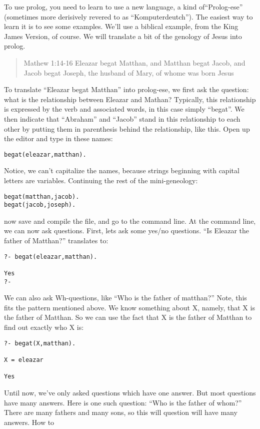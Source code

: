 \documentclass{book}[9pt]
\begin{document}
To use prolog, you need to learn to use a new language, a kind
of``Prolog-ese'' (sometimes more derisively revered to as
``Komputerdeutch'').  The easiest way to learn it is to see some
examples.  We'll use a biblical example, from the King James Version,
of course.  We will translate a bit of the genology of Jesus into prolog.
\begin{quote}
Mathew 1:14-16 Eleazar begat Matthan, and Matthan begat Jacob, and
Jacob begat Joseph, the husband of Mary, of whome was born Jesus
\end{quote}
To translate ``Eleazar begat Matthan'' into prolog-ese, we first ask
the question: what is the relationship between Eleazar and Mathan?
Typically, this relationship is expressed by the verb and associated
words, in this case simply ``begat''.  We then indicate that
``Abraham'' and ``Jacob'' stand in this relationship to each other by
putting them in parenthesis behind the relationship, like this.  Open
up the editor and type in these names:
\begin{verbatim}
begat(eleazar,matthan).
\end{verbatim}
\noindent Notice, we can't capitalize the names, because strings
beginning with capital letters are variables.  Continuing the rest of
the mini-geneology:
\begin{verbatim}
begat(matthan,jacob).
begat(jacob,joseph).
\end{verbatim}
\noindent now save and compile the file, and go to the command line.
At the command line, we can now ask questions.  First, lets ask some
yes/no questions.  ``Is Eleazar the father of Matthan?'' translates
to:
\begin{verbatim}
?- begat(eleazar,matthan).

Yes
?- 
\end{verbatim}
\noindent We can also ask Wh-questions, like ``Who is the father of
matthan?''  Note, this fits the pattern mentioned above.  We know
something about X, namely, that X is the father of Matthan.  So we can
use the fact that X is the father of Matthan to find out exactly who X
is:
\begin{verbatim}
?- begat(X,matthan).

X = eleazar

Yes
\end{verbatim}
Until now, we've only asked questions which have one
answer.  But most questions have many answers.  Here is one such
question: ``Who is the father of whom?''  There are many fathers and
many sons, so this will question will have many answers.  How to
\end{document}
